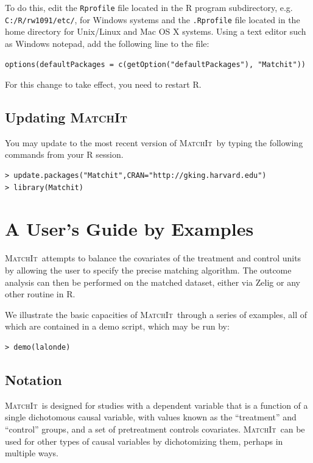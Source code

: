 \documentclass[oneside,letterpaper,titlepage]{article}
\newcommand{\MatchIt}{\textsc{MatchIt}}
\begin{document}
To do this, edit the {\tt Rprofile} file located in the R program
subdirectory, e.g. \texttt{C:/R/rw1091/etc/}, for Windows systems and
the {\tt .Rprofile} file located in the home directory for Unix/Linux
and Mac OS X systems.  Using a text editor such as Windows notepad,
add the following line to the file:
\begin{verbatim}
options(defaultPackages = c(getOption("defaultPackages"), "Matchit"))
\end{verbatim}
For this change to take effect, you need to restart R.

\subsection{Updating \MatchIt}
You may update to the most recent version of \MatchIt\ by typing the
following commands from your R session.

\begin{small}
\begin{verbatim}
> update.packages("Matchit",CRAN="http://gking.harvard.edu")
> library(Matchit) 
\end{verbatim}
\end{small} 

\section{A User's Guide by Examples}
\MatchIt\ attempts to balance the covariates of the treatment and
control units by allowing the user to specify the precise matching
algorithm.  The outcome analysis can then be performed on the matched
dataset, either via Zelig or any other routine in R.

We illustrate the basic capacities of \MatchIt\ through a series of
examples, all of which are contained in a demo script, which may be
run by: 

\begin{verbatim}
> demo(lalonde)
\end{verbatim}

\subsection{Notation}
\MatchIt\ is designed for studies with a dependent variable that is a
function of a single dichotomous causal variable, with values known as
the ``treatment'' and ``control'' groups, and a set of pretreatment
controls covariates.  \MatchIt\ can be used for other types of causal
variables by dichotomizing them, perhaps in multiple ways.
\end{document}
